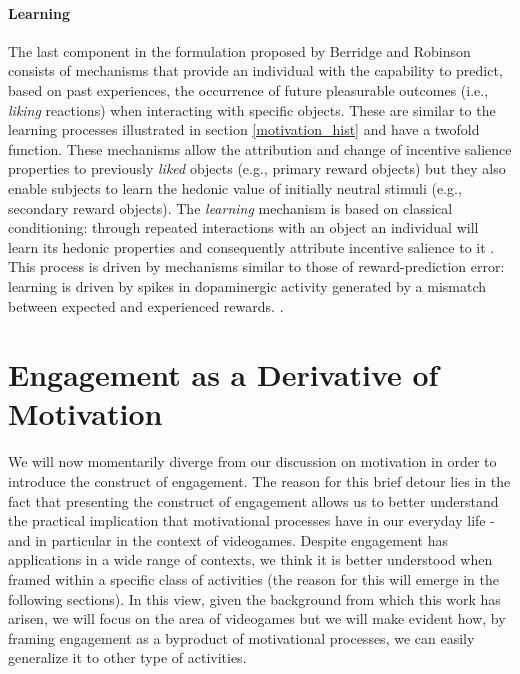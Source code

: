 \paragraph*{Learning}
\label{learning}
The last component in the formulation proposed by Berridge and Robinson \cite{berridge1998role,berridge2004motivation} consists of mechanisms that provide an individual with the capability to predict, based on past experiences, the occurrence of future pleasurable outcomes (i.e., \emph{liking} reactions) when interacting with specific objects. These are similar to the learning processes illustrated in section \ref{motivation_hist} and have a twofold function. These mechanisms allow the attribution and change of incentive salience properties to previously \emph{liked} objects (e.g., primary reward objects) but they also enable subjects to learn the hedonic value of initially neutral stimuli (e.g., secondary reward objects). The \emph{learning} mechanism is based on classical conditioning: through repeated interactions with an object an individual will learn its hedonic properties and consequently attribute incentive salience to it \cite{berridge2004motivation,berridge2009dissecting}. This process is driven by mechanisms similar to those of reward-prediction error: learning is driven by spikes in dopaminergic activity generated by a mismatch between expected and experienced rewards. \cite{schultz1997neural,schultz2000multiple,flagel2011selective}.

\section{Engagement as a Derivative of Motivation}
\label{engagement}
We will now momentarily diverge from our discussion on motivation in order to introduce the construct of engagement. The reason for this brief detour lies in the fact that presenting the construct of engagement allows us to better understand the practical implication that motivational processes have in our everyday life - and in particular in the context of videogames. Despite engagement has applications in a wide range of contexts, we think it is better understood when framed within a specific class of activities (the reason for this will emerge in the following sections). In this view, given the background from which this work has arisen, we will focus on the area of videogames but we will make evident how, by framing engagement as a byproduct of motivational processes, we can easily generalize it to other type of activities.

